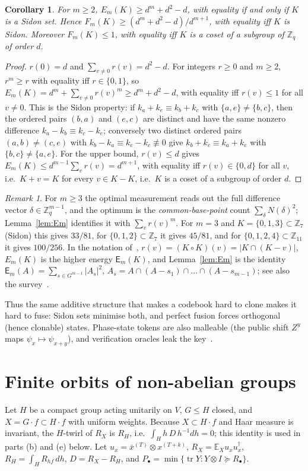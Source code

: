 \documentclass[11pt]{article}
\newcommand{\Z}{\mathbb{Z}}
\newcommand{\E}{\mathbb{E}}
\newcommand{\tr}{\operatorname{tr}}
\newtheorem{corollary}[theorem]{Corollary}
\theoremstyle{definition}
\theoremstyle{remark}
\newtheorem{remark}[theorem]{Remark}
\begin{document}
\begin{corollary}\label{cor:fusionm}
For $m\ge2$, $E_m(K)\ge d^m+d^2-d$, with equality if and only if $K$ is a Sidon set. Hence
$F_m(K)\ge(d^m+d^2-d)/d^{m+1}$, with equality iff $K$ is Sidon. Moreover $F_m(K)\le1$, with equality iff $K$ is a coset of a
subgroup of $\Z_q$ of order $d$.
\end{corollary}
\begin{proof}
$r(0)=d$ and $\sum_{v\ne0}r(v)=d^2-d$. For integers $r\ge0$ and $m\ge2$, $r^m\ge r$ with equality iff $r\in\{0,1\}$, so
$E_m(K)=d^m+\sum_{v\ne0}r(v)^m\ge d^m+d^2-d$, with equality iff $r(v)\le1$ for all $v\ne0$. This is the Sidon property: if
$k_a+k_e\equiv k_b+k_c$ with $\{a,e\}\ne\{b,c\}$, then the ordered pairs $(b,a)$ and $(e,c)$ are distinct and have the same nonzero
difference $k_a-k_b\equiv k_c-k_e$; conversely two distinct ordered pairs $(a,b)\ne(c,e)$ with $k_b-k_a\equiv k_e-k_c\not\equiv0$ give
$k_b+k_c\equiv k_a+k_e$ with $\{b,c\}\ne\{a,e\}$. For the upper bound, $r(v)\le d$ gives $E_m(K)\le d^{m-1}\sum_vr(v)=d^{m+1}$, with
equality iff $r(v)\in\{0,d\}$ for all $v$, i.e.\ $K+v=K$ for every $v\in K-K$, i.e.\ $K$ is a coset of a subgroup of order $d$.
\end{proof}

\begin{remark}
For $m\ge3$ the optimal measurement reads out the full difference vector $\delta\in\Z_q^{m-1}$, and the optimum is the
\emph{common-base-point} count $\sum_\delta N(\delta)^2$; Lemma~\ref{lem:Em} identifies it with $\sum_v r(v)^m$. For $m=3$ and
$K=\{0,1,3\}\subset\Z_7$ (Sidon) this gives $33/81$, for $\{0,1,2\}\subset\Z_7$ it gives $45/81$, and for $\{0,1,2,4\}\subset\Z_{11}$
it gives $100/256$. In the notation of~\cite{SchoenShkredov2013,Shkredov2013HigherEnergies}, $r(v)=(K\circ K)(v)=|K\cap(K-v)|$, $E_m(K)$ is the
higher energy $\mathsf E_m(K)$, and Lemma~\ref{lem:Em} is the identity $\mathsf E_m(A)=\sum_{s\in G^{m-1}}|A_s|^2$,
$A_s=A\cap(A-s_1)\cap\dots\cap(A-s_{m-1})$; see also the survey~\cite{Shkredov2015Survey}.
\end{remark}


Thus the same additive structure that makes a codebook hard to clone makes it hard to fuse: Sidon sets minimise both, and
perfect fusion forces orthogonal (hence clonable) states. Phase-state tokens are also malleable (the public shift $Z^y$ maps
$\psi_x\mapsto\psi_{x+y}$), and verification oracles leak the key~\cite{Nagaj2016}.

\section{Finite orbits of non-abelian groups}\label{sec:nonab}
Let $H$ be a compact group acting unitarily on $V$, $G\le H$ closed, and $X=G\cdot f\subset H\cdot f$ with uniform weights. Because
$X\subset H\cdot f$ and Haar measure is invariant, the $H$-twirl of $R_X$ is $R_H$, i.e.\ $\int_H h\,D\,h^{-1}dh=0$; this identity is used
in parts (b) and (e) below. Let
$u_x=\bar x^{(T)}\otimes x^{(T+k)}$, $R_X=\E_X u_xu_x^\dagger$, $R_H=\int_H R_{hf}\,dh$, $D=R_X-R_H$, and $P_\bullet=\min\{\tr Y:Y\otimes I\succeq R_\bullet\}$.
\end{document}
